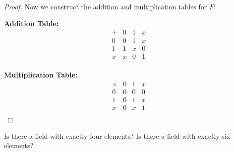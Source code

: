 \begin{proof}
        Now we construct the addition and multiplication tables for \( F \):

        \noindent
        \begin{minipage}{.5\textwidth}
        \centering
        \textbf{Addition Table:}
        \[
        \begin{array}{c|ccc}
        + & 0 & 1 & x \\
        \hline
        0 & 0 & 1 & x \\
        1 & 1 & x & 0 \\
        x & x & 0 & 1 \\
        \end{array}
        \]
        \end{minipage}%
        \begin{minipage}{.5\textwidth}
        \centering
        \textbf{Multiplication Table:}
        \[
        \begin{array}{c|ccc}
        \times & 0 & 1 & x \\
        \hline
        0 & 0 & 0 & 0 \\
        1 & 0 & 1 & x \\
        x & 0 & x & 1 \\
        \end{array}
        \]
        \end{minipage}
        \end{proof}
\begin{problem}
    Is there a field with exactly four elements? Is there a field with exactly six elements?
\end{problem}


